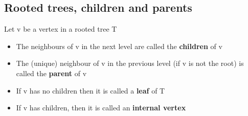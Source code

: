 \documentclass{article}[18pt]
\begin{document}
\subsection{Rooted trees, children and parents}
Let v be a vertex in a rooted tree T
\begin{itemize}
	\item The neighbours of v in the next level are called the \textbf{children} of v
	\item The (unique) neighbour of v in the previous level (if v is not the root) is called the \textbf{parent} of v
	\item If v has no children then it is called a \textbf{leaf} of T
	\item If v has children, then it is called an \textbf{internal vertex}
\end{itemize}
\end{document}
